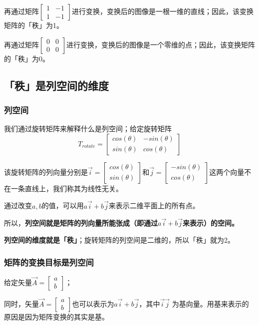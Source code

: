 \documentclass[12pt]{article}
\begin{document}
再通过矩阵$\begin{bmatrix}1&-1\\1&-1\end{bmatrix}$进行变换，变换后的图像是一根一维的直线；因此，该变换矩阵的「秩」为1。

再通过矩阵$\begin{bmatrix}0&0\\0&0\end{bmatrix}$进行变换，变换后的图像是一个零维的点；因此，该变换矩阵的「秩」为0。

\subsection{「秩」是列空间的维度}
\subsubsection{列空间}
我们通过旋转矩阵来解释什么是列空间；给定旋转矩阵
$$
T_{rotate}=
\begin{bmatrix}
    cos(\theta) & -sin(\theta)\\
    sin(\theta) & cos(\theta)
\end{bmatrix}
$$

该旋转矩阵的列向量分别是$\vec{i}=\begin{bmatrix}cos(\theta)\\sin(\theta)\end{bmatrix}$和$\vec{j}=\begin{bmatrix}-sin(\theta)\\cos(\theta)\end{bmatrix}$这两个向量不在一条直线上，我们称其为线性无关。

通过改变$a,b$的值，可以用$a\vec{i} + b\vec{j}$来表示二维平面上的所有点。

所以，\textbf{列空间就是矩阵的列向量所能张成（即通过$a\vec{i} + b\vec{j}$来表示）的空间。}

\textbf{列空间的维度就是「秩」}；旋转矩阵的列空间是二维的，所以「秩」就为2。

\subsubsection{矩阵的变换目标是列空间}
给定矢量$\vec{A} = \begin{bmatrix}a\\b\end{bmatrix}$；

同时，矢量$\vec{A} = \begin{bmatrix}a\\b\end{bmatrix}$也可以表示为$a\vec{i}+b\vec{j}$，其中$\vec{i} \vec{j}$ 为基向量。用基来表示的原因是因为矩阵变换的其实是基。
\end{document}
